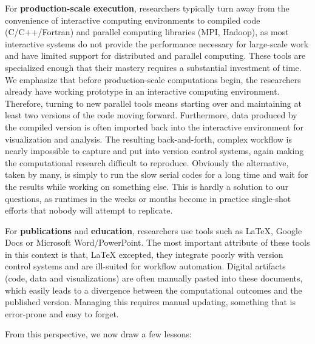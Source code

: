 \documentclass[ChapterTOCs,krantz2]{krantz} %
\theoremstyle{definition}
\begin{document}
For \textbf{production-scale execution}, researchers typically turn away from
the convenience of interactive computing environments to compiled code
(C/C++/Fortran) and parallel computing libraries (MPI, Hadoop), as most
interactive systems do not provide the performance necessary for large-scale
work and have limited support for distributed and parallel computing.  These
tools are specialized enough that their mastery requires a substantial
investment of time. We emphasize that before production-scale computations
begin, the researchers already have working prototype in an interactive
computing environment. Therefore, turning to new parallel tools means starting
over and maintaining at least two versions of the code moving
forward. Furthermore, data produced by the compiled version is often imported
back into the interactive environment for visualization and analysis. The
resulting back-and-forth, complex workflow is nearly impossible to capture and
put into version control systems, again making the computational research
difficult to reproduce.  Obviously the alternative, taken by many, is simply to
run the slow serial codes for a long time and wait for the results while
working on something else.  This is hardly a solution to our questions, as
runtimes in the weeks or months become in practice single-shot efforts that
nobody will attempt to replicate.

For \textbf{publications} and \textbf{education}, researchers use tools such as
\LaTeX, Google Docs or Microsoft Word/PowerPoint.  The most important attribute
of these tools in this context is that, \LaTeX{} excepted, they integrate
poorly with version control systems and are ill-suited for workflow automation.
Digital artifacts (code, data and visualizations) are often manually pasted
into these documents, which easily leads to a divergence between the
computational outcomes and the published version.  Managing this requires
manual updating, something that is error-prone and easy to forget.

From this perspective, we now draw a few lessons:
\end{document}

